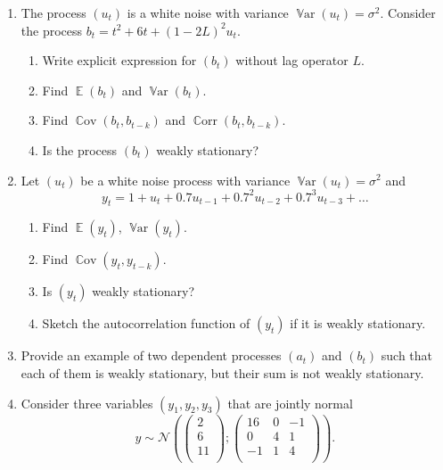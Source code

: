\documentclass[12pt]{article}
\DeclareMathOperator{\Cov}{\mathbb{C}ov}
\DeclareMathOperator{\Corr}{\mathbb{C}orr}
\DeclareMathOperator{\Var}{\mathbb{V}ar}
\DeclareMathOperator{\E}{\mathbb{E}}
\newcommand \cN{\mathcal{N}}
\begin{document}
\begin{enumerate}
  \item The process $(u_t)$ is a white noise with variance $\Var(u_t) = \sigma^2$. 
  Consider the process $b_t = t^2 + 6t + (1-2L)^2 u_t$. %
  
  \begin{enumerate}
    \item Write explicit expression for $(b_t)$ without lag operator $L$.
    \item Find $\E(b_t)$ and $\Var(b_t)$.
    \item Find $\Cov(b_t, b_{t-k})$ and $\Corr(b_t, b_{t-k})$.
    \item Is the process $(b_t)$ weakly stationary?    
  \end{enumerate}

  \item Let $(u_t)$ be a white noise process with variance $\Var(u_t) = \sigma^2$ and 
  \[
  y_t = 1 + u_t + 0.7u_{t-1} + 0.7^2 u_{t-2} + 0.7^3 u_{t-3} + \ldots  
  \]
  \begin{enumerate}
    \item Find $\E(y_t)$, $\Var(y_t)$.
    \item Find $\Cov(y_t, y_{t-k})$.
    \item Is $(y_t)$ weakly stationary?
    \item Sketch the autocorrelation function of $(y_t)$ if it is weakly stationary.
  \end{enumerate}




  \item Provide an example of two dependent processes $(a_t)$ and $(b_t)$ such that each of them is weakly stationary, 
  but their sum is not weakly stationary. 


  \item Consider three variables $(y_1, y_2, y_3)$ that are jointly normal
  \[
  y \sim \cN\left( \begin{pmatrix}
    2 \\
    6 \\
    11 \\
  \end{pmatrix}; \begin{pmatrix}
    16 & 0 & -1 \\
    0 & 4 & 1 \\
    -1 & 1 & 4 \\
  \end{pmatrix}  \right).  
  \]


\end{enumerate}
\end{document}
